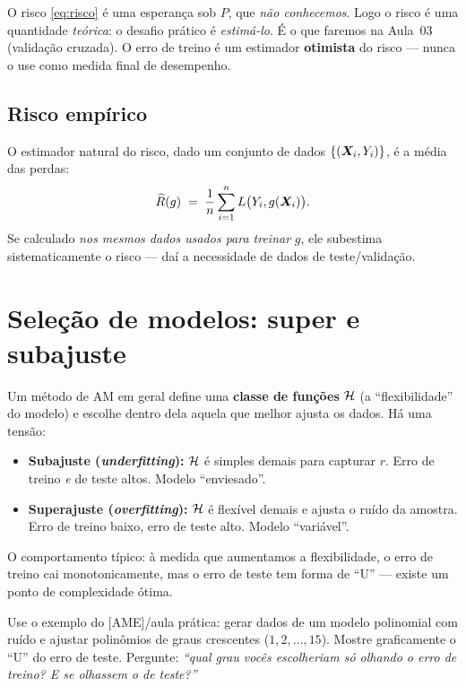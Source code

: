 \documentclass[11pt,a4paper]{article}
\begin{document}
\begin{atencao}
O risco \eqref{eq:risco} é uma esperança sob $P$, que \emph{não conhecemos}.
Logo o risco é uma quantidade \emph{teórica}: o desafio prático é
\emph{estimá-lo}. É o que faremos na Aula~03 (validação cruzada). O erro de
treino é um estimador \textbf{otimista} do risco --- nunca o use como medida
final de desempenho.
\end{atencao}

\subsection{Risco empírico}
O estimador natural do risco, dado um conjunto de dados $\{(\bm{X}_i,Y_i)\}$, é a média
das perdas:
\begin{equation}\label{eq:remp}
  \widehat{R}(g) \;=\; \frac1n \sum_{i=1}^n L\big(Y_i,g(\bm{X}_i)\big).
\end{equation}
Se calculado \emph{nos mesmos dados usados para treinar} $g$, ele subestima
sistematicamente o risco --- daí a necessidade de dados de teste/validação.

\section{Seleção de modelos: super e subajuste}
Um método de AM em geral define uma \textbf{classe de funções} $\mathcal{H}$ (a
``flexibilidade'' do modelo) e escolhe dentro dela aquela que melhor ajusta os
dados. Há uma tensão:
\begin{itemize}[leftmargin=1.4cm]
  \item \textbf{Subajuste (\emph{underfitting}):} $\mathcal{H}$ é simples demais para
        capturar $r$. Erro de treino \emph{e} de teste altos. Modelo
        ``enviesado''.
  \item \textbf{Superajuste (\emph{overfitting}):} $\mathcal{H}$ é flexível demais e
        ajusta o ruído da amostra. Erro de treino baixo, erro de teste alto.
        Modelo ``variável''.
\end{itemize}
O comportamento típico: à medida que aumentamos a flexibilidade, o erro de treino
cai monotonicamente, mas o erro de teste tem forma de ``U'' --- existe um ponto de
complexidade ótima.

\begin{emsala}
Use o exemplo do [AME]/aula prática: gerar dados de um modelo polinomial com ruído
e ajustar polinômios de graus crescentes ($1,2,\dots,15$). Mostre graficamente o
``U'' do erro de teste. Pergunte: \emph{``qual grau vocês escolheriam só olhando o
erro de treino? E se olhassem o de teste?''}
\end{emsala}
\end{document}
